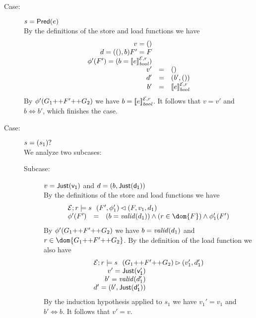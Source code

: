 {\begin{description}
\item[Case:] $s = \mathsf{Pred}(e)$\\[1ex]
%
By the definitions of the store and load functions we have
\[
\begin{array}{rcll}
v = ()\\
d = ((),b)
F' = F\\
\phi'(F') = (b = [\![e]\!]^{\mathcal{E},r}_{\mathit{bool}})\\
v' &=& ()\\
d' &=& (b',())\\
b' &=& [\![e]\!]^{\mathcal{E},r}_{\mathit{bool}}\\
\end{array}
\]
By $\phi'(G_1 \text{++} F' \text{++} G_2)$ we have $b =
[\![e]\!]^{\mathcal{E},r}_{\mathit{bool}}$. It follows that $v = v'$ and $b \iff
b'$, which finishes the case.

\item[Case:] $s = (s_1)?$\\[1ex]
%
We analyze two subcases:
\begin{description}
\item[Subcase:] $v = \mathsf{Just(v_1)}$ and $d = (b,\mathsf{Just(d_1)})$\\[1ex]
%
By the definitions of the store and load functions we have
\[
\begin{array}{rcll}
\multicolumn{3}{l}{\store{\Env}{F}{r}{ v_1,d_1 }{s}{ F',\phi_1' }}\\
\phi'(F') &=& (b = \valid{d_1}) \wedge (r \in \dom{F}) \wedge \phi_1'(F')
\end{array}
\]
%
By $\phi'(G_1 \text{++} F' \text{++} G_2)$ we have $b = \mathit{valid}(d_1)$ and
$r \in \dom{G_1 \FAppend F' \FAppend G_2}$.  By the definition of the
load function we also have
\[ 
\begin{array}{rcll}
\multicolumn{3}{l}{\load{\Env}{(G_1 \FAppend F' \FAppend G_2)}{r}{s}{v_1',d_1'}}\\
v' = \Just{v_1'}\\
b' = \valid{d_1'}\\
d' = (b',\Just{d_1'})\\
\end{array}
\]
By the induction hypothesis applied to $s_1$ we have $v_1' = v_1$ and
$b' \iff b$. It follows that $v' = v$.


\end{description}
\end{description}}
